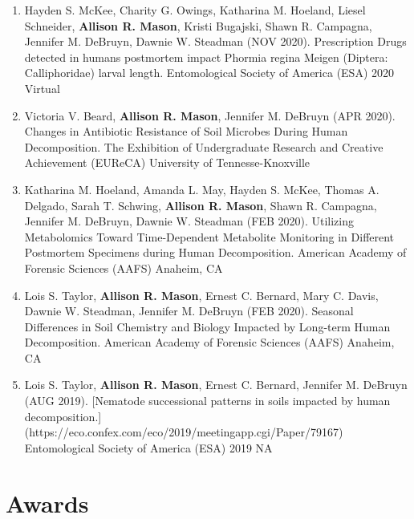 \documentclass[11pt,a4paper,]{awesome-cv}
\begin{document}
\begin{enumerate}
\item Hayden S. McKee, Charity G. Owings, Katharina M. Hoeland, Liesel Schneider, \textbf{Allison R. Mason}, Kristi Bugajski, Shawn R. Campagna, Jennifer M. DeBruyn, Dawnie W. Steadman (NOV 2020). Prescription Drugs detected in humans postmortem impact Phormia regina Meigen (Diptera: Calliphoridae) larval length. Entomological Society of America (ESA) 2020 Virtual
\item Victoria V. Beard, \textbf{Allison R. Mason}, Jennifer M. DeBruyn (APR 2020). Changes in Antibiotic Resistance of Soil Microbes During Human Decomposition. The Exhibition of Undergraduate Research and Creative Achievement (EUReCA) University of Tennesse-Knoxville
\item Katharina M. Hoeland, Amanda L. May, Hayden S. McKee, Thomas A. Delgado, Sarah T. Schwing, \textbf{Allison R. Mason}, Shawn R. Campagna, Jennifer M. DeBruyn, Dawnie W. Steadman (FEB 2020). Utilizing Metabolomics Toward Time-Dependent Metabolite Monitoring in Different Postmortem Specimens during Human Decomposition. American Academy of Forensic Sciences (AAFS) Anaheim, CA
\item Lois S. Taylor, \textbf{Allison R. Mason}, Ernest C. Bernard, Mary C. Davis, Dawnie W. Steadman, Jennifer M. DeBruyn (FEB 2020). Seasonal Differences in Soil Chemistry and Biology Impacted by Long-term Human Decomposition. American Academy of Forensic Sciences (AAFS) Anaheim, CA
\item Lois S. Taylor, \textbf{Allison R. Mason}, Ernest C. Bernard, Jennifer M. DeBruyn (AUG 2019). [Nematode successional patterns in soils impacted by human decomposition.](https://eco.confex.com/eco/2019/meetingapp.cgi/Paper/79167) Entomological Society of America (ESA)  2019 NA
\end{enumerate}

\hypertarget{awards}{%
\section{\texorpdfstring{\faTrophy Awards}{Awards}}\label{awards}}

\begin{cventries}
    \vspace{-4.0mm}
    \vspace{-4.0mm}
    \vspace{-4.0mm}
    \vspace{-4.0mm}
    \vspace{-4.0mm}
\end{cventries}
\end{document}

